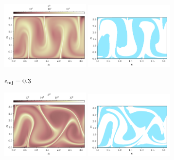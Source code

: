 \begin{figure}
	\begin{center}
		\begin{subfigure}{\textwidth}
			\includegraphics[width=0.49\textwidth]{chp04_paper_numerics/figures/rossby/S2_zero_0.3}
			\includegraphics[width=0.49\textwidth]{chp04_paper_numerics/figures/rossby/S2_robust_0.3}
			\caption{\(\epsilon_{\mathrm{mj}} = 0.3\)}
			\label{fig:s2_field_0.3}
		\end{subfigure}
		\begin{subfigure}{\textwidth}
			\includegraphics[width=0.49\textwidth]{chp04_paper_numerics/figures/rossby/s2_zero_1.0}
			\includegraphics[width=0.49\textwidth]{chp04_paper_numerics/figures/rossby/s2_robust_1.0}

\end{subfigure}
\end{center}
\end{figure}
